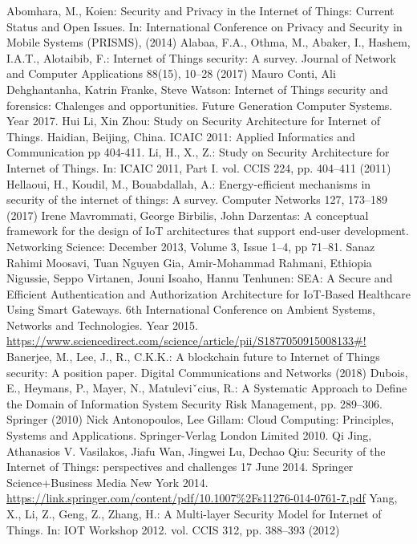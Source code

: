 \documentclass[12pt]{article}
\begin{document}
\begin{thebibliography}{9}
	Abomhara, M., Koien: Security and Privacy in the Internet of Things: Current
	Status and Open Issues. In: International Conference on Privacy and Security in Mobile Systems (PRISMS), (2014)
	Alabaa, F.A., Othma, M., Abaker, I., Hashem, I.A.T., Alotaibib, F.: Internet of Things security: A survey. Journal of Network and Computer Applications 88(15), 10–28 (2017)
	Mauro Conti, Ali Dehghantanha, Katrin Franke, Steve Watson: Internet of Things security and forensics: Chalenges and opportunities.
	Future Generation Computer Systems.
	Year 2017.
	Hui Li, Xin Zhou: Study on Security Architecture for Internet of Things.
	Haidian, Beijing, China.
	ICAIC 2011: Applied Informatics and Communication pp 404-411. 
	Li, H., X., Z.: Study on Security Architecture for Internet of Things. In: ICAIC 2011, Part I. vol. CCIS 224, pp. 404–411 (2011)
	Hellaoui, H., Koudil, M., Bouabdallah, A.: Energy-efficient mechanisms in security of the internet of things: A survey. Computer Networks 127, 173–189 (2017)
	Irene Mavrommati, George Birbilis, John Darzentas: A conceptual framework for the design of IoT architectures that support end-user development.
	Networking Science: December 2013, Volume 3, Issue 1–4, pp 71–81.
	Sanaz Rahimi Moosavi, Tuan Nguyen Gia, Amir-Mohammad Rahmani, Ethiopia Nigussie, Seppo Virtanen, Jouni Isoaho, Hannu Tenhunen: SEA: A Secure and Efficient Authentication and Authorization Architecture for IoT-Based Healthcare Using Smart Gateways.
	6th International Conference on Ambient Systems, Networks and Technologies.
	Year 2015.
	\url{https://www.sciencedirect.com/science/article/pii/S1877050915008133#!}
	Banerjee, M., Lee, J., R., C.K.K.: A blockchain future to Internet of Things security: A position paper. Digital Communications and Networks (2018)
	Dubois, E., Heymans, P., Mayer, N., Matuleviˇcius, R.: A Systematic Approach to Define the Domain of Information System Security Risk Management, pp. 289–306. Springer (2010)
	Nick Antonopoulos, Lee Gillam: Cloud Computing: Principles, Systems and Applications.
	Springer-Verlag London Limited 2010.
	Qi Jing, Athanasios V. Vasilakos, Jiafu Wan, Jingwei Lu, Dechao Qiu: Security of the Internet of Things: perspectives and challenges
	17 June 2014.
	Springer Science+Business Media New York 2014.
	\url{https://link.springer.com/content/pdf/10.1007%2Fs11276-014-0761-7.pdf}
	Yang, X., Li, Z., Geng, Z., Zhang, H.: A Multi-layer Security Model for Internet of Things. In: IOT Workshop 2012. vol. CCIS 312, pp. 388–393 (2012)

\end{thebibliography}
\end{document}
